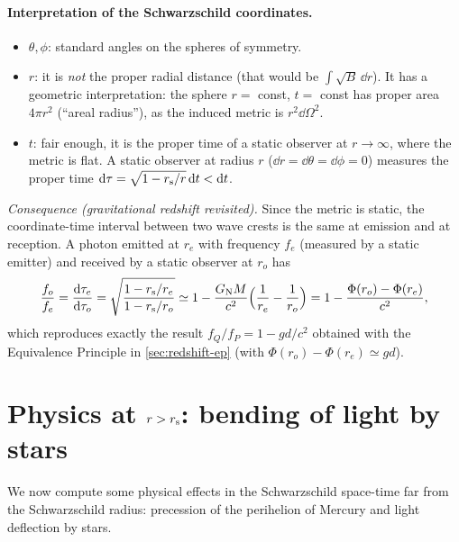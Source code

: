 \paragraph{Interpretation of the Schwarzschild coordinates.}
\begin{itemize}
\item $\theta,\phi$: standard angles on the spheres of symmetry.
\item $r$: it is \emph{not} the proper radial distance (that would be $\int\sqrt{B}\,\dd r$). It has a geometric interpretation: the sphere $r=$ const, $t=$ const has proper area $4\pi r^2$ (``areal radius''), as the induced metric is $r^2\dd\Omega^2$.
\item $t$: fair enough, it is the proper time of a static observer at $r\to\infty$, where the metric is flat. A static observer at radius $r$ ($\dd r=\dd\theta=\dd\phi=0$) measures the proper time $\mathrm{d}\tau=\sqrt{1-r_{\mathrm s}/r}\,\mathrm{d} t<\mathrm{d} t$.
\end{itemize}
\textit{Consequence (gravitational redshift revisited).} Since the metric is static, the coordinate-time interval between two wave crests is the same at emission and at reception. A photon emitted at $r_e$ with frequency $f_e$ (measured by a static emitter) and received by a static observer at $r_o$ has
\begin{equation}
  \frac{f_o}{f_e}=\frac{\mathrm{d}\tau_e}{\mathrm{d}\tau_o}=\sqrt{\frac{1-r_{\mathrm s}/r_e}{1-r_{\mathrm s}/r_o}}\simeq1-\frac{G_{\mathrm N} M}{c^2}\Big(\frac1{r_e}-\frac1{r_o}\Big)=1-\frac{\Phi(r_o)-\Phi(r_e)}{c^2},
\end{equation}
which reproduces exactly the result $f_Q/f_P=1-gd/c^2$ obtained with the Equivalence Principle in \cref{sec:redshift-ep} (with $\Phi(r_o)-\Phi(r_e)\simeq gd$).

\section{Physics at $r>r_{\mathrm s}$: bending of light by stars}\label{sec:light-bending}
We now compute some physical effects in the Schwarzschild space-time far from the Schwarzschild radius: precession of the perihelion of Mercury and light deflection by stars.

